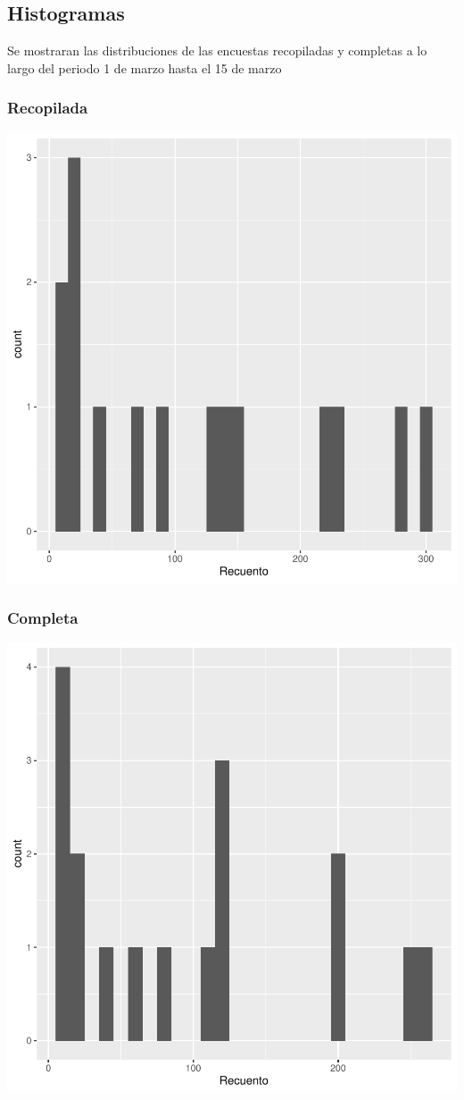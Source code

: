 \documentclass{article}
\begin{document}
\subsection{Histogramas}
Se mostraran las distribuciones de las encuestas recopiladas y completas a lo largo del periodo 1 de marzo hasta el 15 de marzo

\subsubsection{Recopilada}

\includegraphics{seguimento2-049}


\subsubsection{Completa}

\includegraphics{seguimento2-050}
\end{document}
